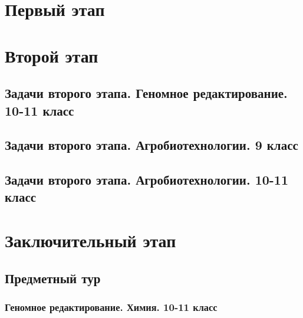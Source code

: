 \documentclass[a4paper,12pt,oneside]{book}
\begin{document}

\setcounter{tocdepth}{1}

\setcounter{page}{3}

\tableofcontents



\part{Первый этап}
\clearpage




\part{Второй этап}
\clearpage
\chapter{Задачи второго этапа. Геномное редактирование. 10-11 класс}


 
\chapter{Задачи второго этапа. Агробиотехнологии. 9 класс}


\chapter{Задачи второго этапа. Агробиотехнологии. 10-11 класс}


\part{Заключительный этап}

\clearpage
\chapter{Предметный тур}

\section{Геномное редактирование. Химия. 10-11 класс}

\end{document}
